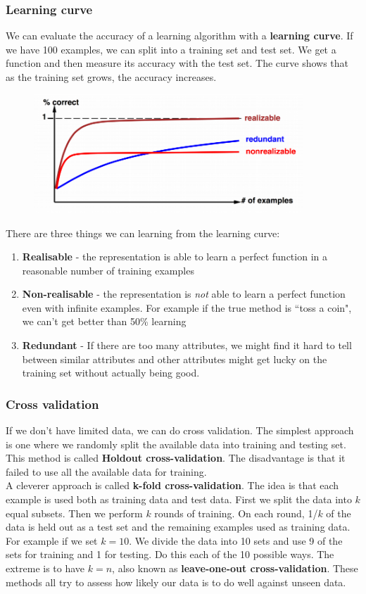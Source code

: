 \documentclass{article}
\newcommand{\n}[0]{\\[\baselineskip]}
\begin{document}
\subsubsection{Learning curve}
We can evaluate the accuracy of a learning algorithm with a \textbf{learning curve}. If we have 100 examples, we can split into a training set and test set. We get a function and then measure its accuracy with the test set. The curve shows that as the training set grows, the accuracy increases.
\begin{figure}[H]
\centering
\includegraphics[width=0.9\textwidth, keepaspectratio]{imgs/decision-tree-learning-curve.png}
\end{figure}
\noindent
There are three things we can learning from the learning curve:
\begin{enumerate}
\item \textbf{Realisable} - the representation is able to learn a perfect function in a reasonable number of training examples
\item \textbf{Non-realisable} - the representation is \textit{not} able to learn a perfect function even with infinite examples. For example if the true method is ``toss a coin", we can't get better than 50\% learning
\item \textbf{Redundant} - If there are too many attributes, we might find it hard to tell between similar attributes and other attributes might get lucky on the training set without actually being good.
\end{enumerate}
\subsubsection{Cross validation}
If we don't have limited data, we can do cross validation. The simplest approach is one where we randomly split the available data into training and testing set. This method is called \textbf{Holdout cross-validation}. The disadvantage is that it failed to use all the available data for training. 
\n
A cleverer approach is called \textbf{k-fold cross-validation}. The idea is that each example is used both as training data and test data. First we split the data into $k$ equal subsets. Then we perform $k$ rounds of training. On each round, 1/$k$ of the data is held out as a test set and the remaining examples used as training data. For example if we set $k = 10$. We divide the data into 10 sets and use 9 of the sets for training and 1 for testing. Do this each of the 10 possible ways. The extreme is to have $k = n$, also known as \textbf{leave-one-out cross-validation}. These methods all try to assess how likely our data is to do well against unseen data.
\end{document}
